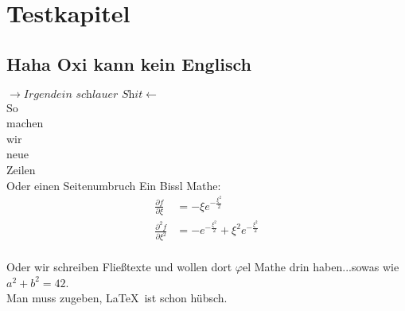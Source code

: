 \section{Testkapitel}
\subsection{Haha Oxi kann kein Englisch}
$\rightarrow \textit{Irgendein schlauer Shit} \leftarrow$
\\ So \\ machen \\ wir\\ neue \\ Zeilen \\ Oder einen Seitenumbruch \newpage
Ein Bissl Mathe:  
\begin{align}
     \frac{\partial f}{\partial \xi} &= - \xi e^{-\frac{\xi^2}{2}} \\
     \frac{\partial^2 f}{\partial \xi^2} &= - e^{-\frac{\xi^2}{2}}+ \xi^2 e^{-\frac{\xi^2}{2}} \\
\end{align}

Oder wir schreiben Fließtexte und wollen dort $\varphi$el Mathe drin haben...sowas wie $a^2+b^2=42$.\\

Man muss zugeben, \LaTeX \, ist schon hübsch.